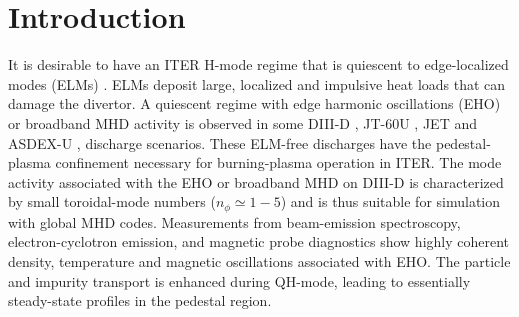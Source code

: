 \section{Introduction}
\label{sec:introduction}


It is desirable to have an ITER \cite{ITER} H-mode regime that is quiescent to
edge-localized modes (ELMs) \cite{connor98,leonard06}. ELMs deposit large,
localized and impulsive heat loads that can damage the divertor. A quiescent
regime with edge harmonic oscillations (EHO) or broadband MHD activity is
observed in some DIII-D
\cite{burrell01,burrell05,burrell09,garofalo11,burrell12,burrell13,solomon14,garofalo15},
JT-60U \cite{Sakamoto04,oyama05}, JET \cite{solano10} and ASDEX-U \cite{suttrop05}, discharge
scenarios. These ELM-free discharges have the pedestal-plasma confinement
necessary for burning-plasma operation in ITER\cite{garofalo15}. The mode
activity associated with the EHO or broadband MHD on DIII-D is characterized by
small toroidal-mode numbers ($n_\phi\simeq1-5$) and is thus suitable for
simulation with global MHD codes.  Measurements from beam-emission
spectroscopy, electron-cyclotron emission, and magnetic probe diagnostics show
highly coherent density, temperature and magnetic oscillations associated with
EHO.  The particle and impurity \cite{grierson15} transport is enhanced during
QH-mode, leading to essentially steady-state profiles in the pedestal region.

